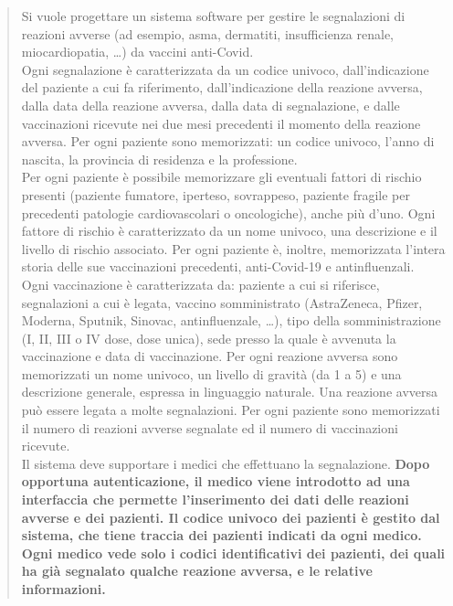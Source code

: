 \documentclass[11pt]{article}
\begin{document}
            \begin{quotation}
                Si vuole progettare un sistema software per gestire le segnalazioni di reazioni avverse (ad esempio, asma, dermatiti, insufficienza renale, miocardiopatia, \dots) da vaccini anti-Covid.\\
                Ogni segnalazione è caratterizzata da un codice univoco, dall'indicazione del paziente a cui fa riferimento, dall'indicazione della reazione avversa, dalla data della reazione avversa, dalla data di segnalazione, e dalle vaccinazioni ricevute nei due mesi precedenti il momento della reazione avversa.
                Per ogni paziente sono memorizzati: un codice univoco, l'anno di nascita, la provincia di residenza e la professione.\\
                Per ogni paziente è possibile memorizzare gli eventuali fattori di rischio presenti (paziente fumatore, iperteso, sovrappeso, paziente fragile per precedenti patologie cardiovascolari o oncologiche), anche più d'uno. Ogni fattore di rischio è caratterizzato da un nome univoco, una descrizione e il livello di rischio associato. Per ogni paziente è, inoltre, memorizzata l'intera storia delle sue vaccinazioni precedenti, anti-Covid-19 e antinfluenzali.\\
                Ogni vaccinazione è caratterizzata da: paziente a cui si riferisce, segnalazioni a cui è legata, vaccino somministrato (AstraZeneca, Pfizer, Moderna, Sputnik, Sinovac, antinfluenzale, \dots), tipo della somministrazione (I, II, III o IV dose, dose unica), sede presso la quale è avvenuta la vaccinazione e data di vaccinazione. Per ogni reazione avversa sono memorizzati un nome univoco, un livello di gravità (da 1 a 5) e una descrizione generale, espressa in linguaggio naturale. Una reazione avversa può essere legata a molte segnalazioni. Per ogni paziente sono memorizzati il numero di reazioni avverse segnalate ed il numero di vaccinazioni ricevute.\\
                Il sistema deve supportare i medici che effettuano la segnalazione. \textbf{Dopo opportuna autenticazione, il medico viene introdotto ad una interfaccia che permette l'inserimento dei dati delle reazioni avverse e dei pazienti. Il codice univoco dei pazienti è gestito dal sistema, che tiene traccia dei pazienti indicati da ogni medico. Ogni medico vede solo i codici identificativi dei pazienti, dei quali ha già segnalato qualche reazione avversa, e le relative informazioni.}
            \end{quotation}
\end{document}
